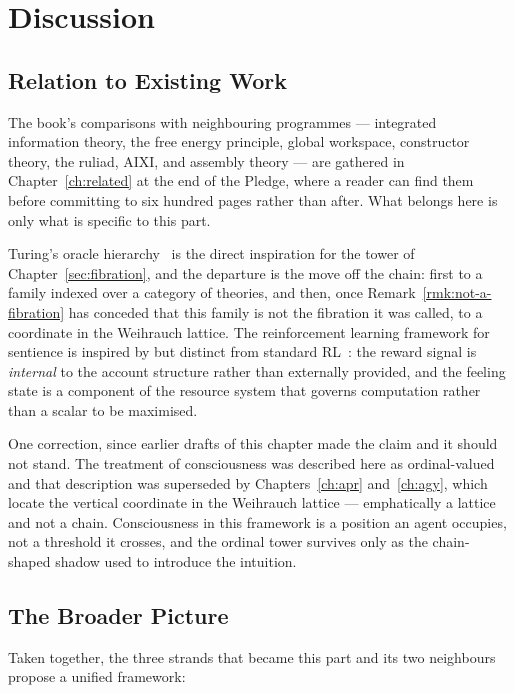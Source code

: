 \chapter{Discussion}
\label{sec:hyper-discussion}

\section{Relation to Existing Work}

The book's comparisons with neighbouring programmes --- integrated
information theory, the free energy principle, global workspace,
constructor theory, the ruliad, AIXI, and assembly theory --- are
gathered in Chapter~\ref{ch:related} at the end of the Pledge, where a
reader can find them before committing to six hundred pages rather than
after.
What belongs here is only what is specific to this part.

Turing's oracle hierarchy~\cite{turing1939} is the direct inspiration
for the tower of Chapter~\ref{sec:fibration}, and the departure is the
move off the chain: first to a family indexed over a category of
theories, and then, once Remark~\ref{rmk:not-a-fibration} has conceded
that this family is not the fibration it was called, to a coordinate in
the Weihrauch lattice.
The reinforcement learning framework for sentience is inspired by but
distinct from standard RL~\cite{sutton2018reinforcement}: the reward
signal is \emph{internal} to the account structure rather than
externally provided, and the feeling state is a component of the
resource system that governs computation rather than a scalar to be
maximised.

One correction, since earlier drafts of this chapter made the claim and
it should not stand.
The treatment of consciousness was described here as ordinal-valued and
that description was superseded by Chapters~\ref{ch:apr}
and~\ref{ch:agy}, which locate the vertical coordinate in the Weihrauch
lattice --- emphatically a lattice and not a chain.
Consciousness in this framework is a position an agent occupies, not a
threshold it crosses, and the ordinal tower survives only as the
chain-shaped shadow used to introduce the intuition.

\section{The Broader Picture}

Taken together, the three strands that became this part and its two
neighbours propose a unified framework:

